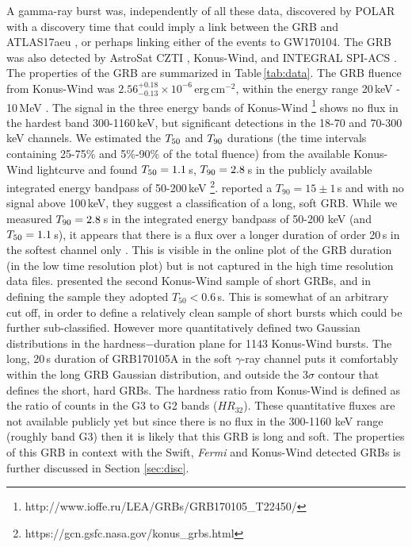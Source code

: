 \documentclass[twocolumn]{aastex61}
\begin{document}
A gamma-ray burst  was, independently of all these data, 
discovered by POLAR \citep[GRB170105A;][]{GCN20387} with  
 a discovery time that could imply a link between the 
GRB and ATLAS17aeu
\citep[as initially proposed by][]{GCN20393}, or perhaps linking either of the events to GW170104. 
The GRB was also detected by  AstroSat CZTI \citep{GCN20389},  Konus-Wind, and INTEGRAL SPI-ACS
\citep{GCN20406}.  The properties  of the GRB are summarized in Table\,\ref{tab:data}. 
The GRB fluence from Konus-Wind was  $2.56_{-0.13}^{+0.18}\times10^{-6}$\,erg\,cm$^{-2}$,
within the energy range  20\,keV - 10\,MeV \citep{GCN20406}. The signal in the 
three energy bands 
of Konus-Wind \footnote{http://www.ioffe.ru/LEA/GRBs/GRB170105\_T22450/}
shows no flux  in the hardest band  300-1160\,keV, but significant detections
in the 18-70 and 70-300\,keV channels.  
We estimated the $T_{\rm 50}$ and $T_{\rm 90}$ durations (the time intervals containing 25-75\%  and 
5\%-90\%  of the total fluence) 
from the available Konus-Wind 
lightcurve and found $T_{\rm 50}=1.1$\,s, $T_{\rm 90}=2.8$\,s in the publicly 
available integrated 
energy bandpass of 50-200\,keV \footnote{https://gcn.gsfc.nasa.gov/konus\_grbs.html}. 
\cite{2017arXiv170600024B} reported a $T_{90}=15\pm 1$\,s
and with no signal above  100\,keV, they suggest 
a classification of a long, soft GRB.
While we measured $T_{\rm 90}=2.8$\,s in the integrated energy bandpass of 
50-200 keV (and $T_{\rm 50}=1.1$\,s), it appears that there is a flux over a longer duration of order 
20\,s in the softest channel only 
\citep[18-70keV][]{GCN20406}. This is visible in 
the online plot of the GRB duration (in the low
time resolution plot) but is not captured in the
high time resolution data files. 
\cite{2016ApJS..224...10S} presented the second Konus-Wind sample of short GRBs, and 
 in defining the sample they adopted $T_{50}<0.6$\,s. This is somewhat of an arbitrary cut off, 
 in order to define a relatively clean sample of short bursts which could be further 
 sub-classified. However \cite{2016ApJS..224...10S} more quantitatively 
 defined two Gaussian distributions in the hardness$-$duration plane for 
 1143 Konus-Wind bursts. 
The long, 20\,s duration of GRB170105A in the soft $\gamma$-ray channel 
puts it comfortably within the long GRB Gaussian distribution, and outside
the 3$\sigma$ contour that defines the short, hard GRBs. 
The hardness ratio from Konus-Wind is defined as the ratio of counts in the G3 to G2 bands ($HR_{32}$). These quantitative fluxes are not available publicly yet but since there is no flux in the 300-1160 keV range (roughly band G3) then it is likely that this GRB is long and soft. The properties of this GRB in context with the Swift, {\it Fermi} and Konus-Wind detected GRBs is further discussed in Section \ref{sec:disc}.
\end{document}
